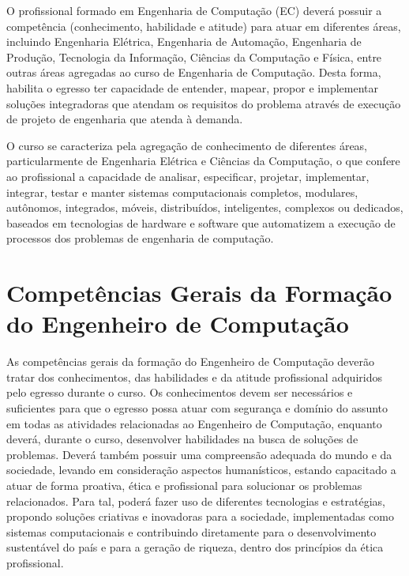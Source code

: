 
O profissional formado em Engenharia de Computação (EC) deverá possuir a competência (conhecimento, habilidade e atitude) para atuar em diferentes áreas, incluindo Engenharia Elétrica, Engenharia de Automação, Engenharia de Produção, Tecnologia da Informação, Ciências da Computação e Física, entre outras áreas agregadas ao curso de Engenharia de Computação. Desta forma, habilita o egresso ter capacidade de entender, mapear, propor e implementar soluções integradoras que atendam os requisitos do problema através de execução de projeto de engenharia que atenda à demanda.



O curso se caracteriza pela agregação de conhecimento de diferentes áreas, particularmente de Engenharia Elétrica e Ciências da Computação, o que confere ao profissional a capacidade de analisar, especificar, projetar, implementar, integrar, testar e manter sistemas computacionais completos, modulares, autônomos, integrados, móveis, distribuídos, inteligentes, complexos ou dedicados, baseados em tecnologias de hardware e software que automatizem a execução de processos dos problemas de engenharia de computação.


\section{Competências Gerais da Formação do Engenheiro de Computação}\label{sec:competencias-gerais-da-formacao-do-engenheiro-de-computacao}

As competências gerais da formação do Engenheiro de Computação deverão tratar dos conhecimentos, das habilidades e da atitude profissional adquiridos pelo egresso durante o curso. Os conhecimentos devem ser necessários e suficientes para que o egresso possa atuar com segurança e domínio do assunto em todas as atividades relacionadas ao Engenheiro de Computação, enquanto deverá, durante o curso, desenvolver habilidades na busca de soluções de problemas. Deverá também possuir uma compreensão adequada do mundo e da sociedade, levando em consideração aspectos humanísticos, estando capacitado a atuar de forma proativa, ética e profissional para solucionar os problemas relacionados.
Para tal, poderá fazer uso de diferentes tecnologias e estratégias, propondo soluções criativas e inovadoras para a sociedade, implementadas como sistemas computacionais e contribuindo diretamente para o desenvolvimento sustentável do país e para a geração de riqueza, dentro dos princípios da ética profissional.

